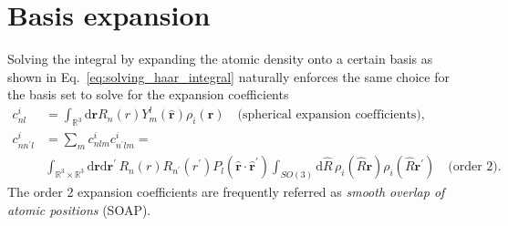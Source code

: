\section{Basis expansion}
Solving the integral by expanding the atomic density onto a certain basis as shown in Eq.~\eqref{eq:solving_haar_integral} naturally enforces the same choice for the basis set to solve for the expansion coefficients
\begin{subequations}
\label{eq:acdc_expansion}
\begin{align}
    \label{eq:gaussian_expansion}
    c^i_{nl} &= \int_{\mathbb{R}^3}\mathrm{d}\mathbf{r} R_n(r)Y_m^l(\hat{\mathbf{r}})\rho_i(\mathbf{r})\quad\textrm{(spherical expansion coefficients),}\\
    c^i_{nn^\prime l} &= \sum_m c^i_{nlm}c^i_{n^\prime lm} = \nonumber \\
    \label{eq:soap_expansion}
                         &\int_{\mathbb{R}^3\times\mathbb{R}^3}\mathrm{d}\mathbf{r}\mathrm{d}\mathbf{r}^\prime\, R_n(r)R_{n^\prime}(r^\prime)P_l(\hat{\mathbf{r}}\cdot\hat{\mathbf{r}}^\prime) \int_{SO(3)}\mathrm{d}\hat{R}\,\rho_i(\hat{R}\mathbf{r})\rho_i(\hat{R}\mathbf{r}^\prime)\quad\textrm{(order 2)}.
\end{align}
\end{subequations}
The order 2 expansion coefficients are frequently referred as \emph{smooth overlap of atomic positions} (SOAP)\cite{bartok2013representing}.

